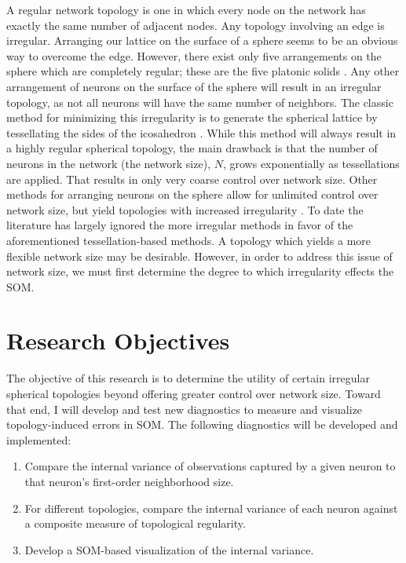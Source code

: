 \documentclass[10pt,titlepage]{article}
\begin{document}
A regular network topology is one in which every node on the network has exactly the
same number of adjacent nodes.  Any topology involving an edge is irregular.
Arranging our lattice on the surface of a sphere seems to be an obvious
way to overcome the edge.  However, there exist only five arrangements on the
sphere which are completely regular; these are the five platonic solids \citep{ritter99,
harris2000}.  Any other arrangement of neurons on the surface of the sphere will
result in an irregular topology, as not all neurons will have the same number of
neighbors.  The classic method for minimizing this irregularity is to generate
the spherical lattice by tessellating the sides of the icosahedron
\citep{Nishio:2006fk}.  While this method will always result in a highly
regular spherical topology, the main drawback is that the number of neurons in
the network (the network size), \(N\), grows exponentially as tessellations are
applied. That results in only very coarse control over network size.
 Other methods for arranging neurons on the sphere allow
for unlimited control over network size, but yield topologies with increased
irregularity \citep{harris2000, wu2005, Nishio:2006fk}.  To date the
literature has largely ignored the more irregular methods in favor of the
aforementioned tessellation-based methods.  A topology which yields a more flexible network
size may be desirable.  However, in order to address this issue of network
size, we must first determine the degree to which irregularity effects the
SOM.

\section{Research Objectives}
The objective of this research is to determine the utility of certain irregular
spherical topologies beyond offering greater control over network size. Toward that
end, I will develop and test new diagnostics to measure and visualize
topology-induced errors in SOM. The following diagnostics
will be developed and implemented:

\begin{enumerate}
    	\item Compare the internal variance of observations captured by a given neuron to that neuron's first-order neighborhood size.
	\item For different topologies, compare the internal variance of each neuron against a composite measure of topological regularity.
	\item Develop a SOM-based visualization of the internal variance.
\end{enumerate}
\end{document}
